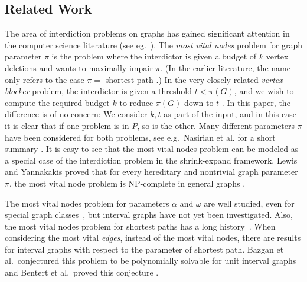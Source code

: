 \subsection{Related Work}
The area of interdiction problems on graphs has gained significant attention in 
the computer science literature (see eg.~\cite{NetworkInterdictProblemsBookChapter}).
The \emph{most vital nodes} problem for graph parameter $\pi$ is the problem where the interdictor is given a budget of $k$ vertex deletions and wants to maximally impair $\pi$. (In the earlier literature, the name only refers to the case $\pi =$  shortest path \cite{mostVitalLinksNodes1982}.)  In the very closely related \emph{vertex blocker} problem, the interdictor is given a threshold $t < \pi(G)$, and we wish to compute the required budget $k$ to reduce $\pi(G)$ down to $t$ \cite{shortPathsInterdictionTotalAndNodeWise}. In this paper, the difference is of no concern: We consider $k, t$ as part of the input, and in this case it is clear that if one problem is in $P$, so is the other. Many different parameters $\pi$ have been considered for both problems, see e.g.\ Nasirian et al. for a short summary \cite{nasirian2019exact}.
It is easy to see that the most vital nodes problem can be modeled as a special case of the interdiction problem in the shrink-expand framework.
Lewis and Yannakakis proved that for every hereditary and nontrivial graph parameter $\pi$, 
the most vital node problem is NP-complete in general graphs \cite{metaTheoremHereditary}.
 
The most vital nodes problem for parameters $\alpha$ and $\omega$ are well studied, 
even for special graph classes~\cite{mostVitalNodesWrtIndSet,costa2011minimum},
but interval graphs have not yet been investigated. Also, the most vital nodes 
problem for shortest paths has a long history~\cite{baier2010length,complexityOfFindingMostVitalNodesShortestPath,mostVitalLinksNodes1982,shortPathsInterdictionTotalAndNodeWise}.
When considering the most vital \emph{edges}, instead of the most vital nodes, there are results for interval graphs with respect to the parameter of shortest path. Bazgan et al.\ conjectured this problem to be polynomially solvable for unit interval graphs \cite{bazgan2019more} and Bentert et al.\ proved this conjecture \cite{bentert2019lengthboundedcuts}.



